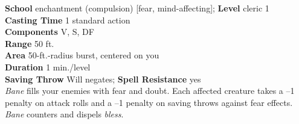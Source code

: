 \textbf{School} enchantment (compulsion) [fear, mind-affecting]; \textbf{Level} cleric 1\\
\textbf{Casting Time} 1 standard action\\
\textbf{Components} V, S, DF\\
\textbf{Range} 50 ft.\\
\textbf{Area} 50-ft.-radius burst, centered on you\\
\textbf{Duration} 1 min./level\\
\textbf{Saving Throw }Will negates; \textbf{Spell Resistance} yes\\
\textit{Bane }fills your enemies with fear and doubt. Each affected creature takes a --1 penalty on attack rolls and a --1 penalty on saving throws against fear effects. \textit{Bane }counters and dispels \textit{bless}.\\
